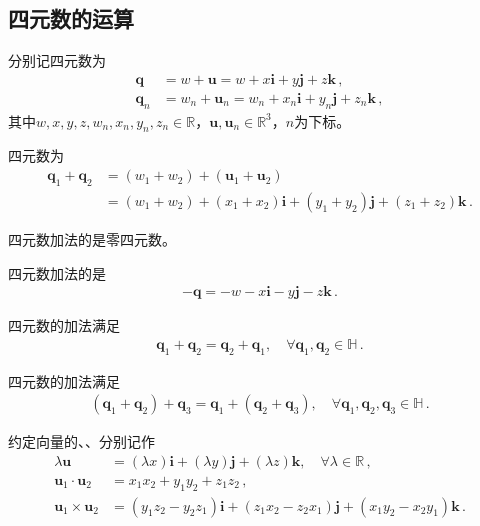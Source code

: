 \subsection{四元数的运算}\label{sub:四元数的运算}
分别记四元数为
\begin{align}
    {\bm q}   & =w+{\bm u}=w+x\mathbf{i}+y\mathbf{j}+z\mathbf{k}\, ,             \\
    {\bm q}_n & =w_n+{\bm u}_n=w_n+x_n\mathbf{i}+y_n\mathbf{j}+z_n\mathbf{k}\, ,
\end{align}
其中$w, x, y, z, w_n, x_n, y_n, z_n\in\mathbb{R}$，${\bm u}, {\bm u}_n\in\mathbb{R}^3$，$n$为下标。
\begin{definition}
    四元数为
    \begin{align}
        {\bm q}_1+{\bm q}_2 & =(w_1+w_2)+({\bm u}_1+{\bm u}_2)\nonumber                                  \\
                            & =(w_1+w_2)+(x_1+x_2)\mathbf{i}+(y_1+y_2)\mathbf{j}+(z_1+z_2)\mathbf{k}\, .
    \end{align}
\end{definition}
\begin{proposition}
    四元数加法的是零四元数。
\end{proposition}
\begin{proposition}
    四元数加法的是
    \begin{align}
        -{\bm q}=-w-x\mathbf{i}-y\mathbf{j}-z\mathbf{k}\, .
    \end{align}
\end{proposition}
\begin{proposition}
    四元数的加法满足
    \begin{align}
        {\bm q}_1+{\bm q}_2={\bm q}_2+{\bm q}_1, \quad \forall {\bm q}_1, {\bm q}_2\in \mathbb{H}\, .
    \end{align}
\end{proposition}
\begin{proposition}
    四元数的加法满足
    \begin{align}
        ({\bm q}_1+{\bm q}_2)+{\bm q}_3={\bm q}_1+({\bm q}_2+{\bm q}_3), \quad \forall {\bm q}_1, {\bm q}_2, {\bm q}_3\in \mathbb{H}\, .
    \end{align}
\end{proposition}
\begin{notation}
    约定向量的、、分别记作
    \begin{align}
        \lambda{\bm u}           & =(\lambda x)\mathbf{i}+(\lambda y)\mathbf{j}+(\lambda z)\mathbf{k},\quad \forall \lambda\in\mathbb{R}\, , \\
        {\bm u}_1\cdot{\bm u}_2  & =x_1x_2+y_1y_2+z_1z_2\, ,                                                                                 \\
        {\bm u}_1\times{\bm u}_2 & =(y_1z_2-y_2z_1)\mathbf{i}+(z_1x_2-z_2x_1)\mathbf{j}+(x_1y_2-x_2y_1)\mathbf{k}\, .
    \end{align}
\end{notation}
